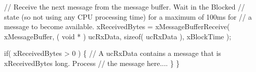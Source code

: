 \begin{DoxyPre}    // Receive the next message from the message buffer.  Wait in the Blocked
    // state (so not using any CPU processing time) for a maximum of 100ms for
    // a message to become available.
    xReceivedBytes = xMessageBufferReceive( xMessageBuffer,
                                            ( void * ) ucRxData,
                                            sizeof( ucRxData ),
                                            xBlockTime );\end{DoxyPre}



\begin{DoxyPre}    if( xReceivedBytes > 0 )
    \{
        // A ucRxData contains a message that is xReceivedBytes long.  Process
        // the message here....
    \}
\}
\end{DoxyPre}
 